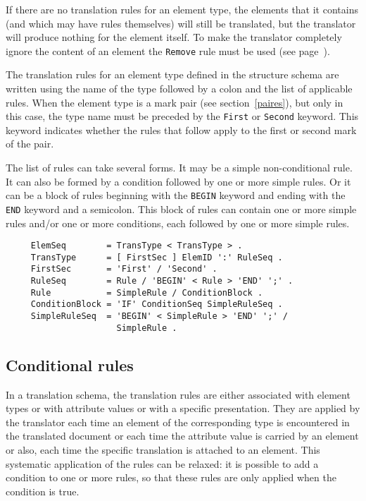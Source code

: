 If there are no translation rules for an element type, the elements
that it contains (and which may have rules themselves) will still be
translated, but the translator will produce nothing for the element
itself.  To make the translator completely ignore the content of an
element the {\tt Remove} rule must be used (see
page~\pageref{remove}).

The translation rules for an element type defined in the structure
schema are written using the name of the type followed by a colon and
the list of applicable rules.  When the element  type is a mark pair
(see section~\ref{paires}), but only in this case, the type name must
be preceded by the {\tt First} or {\tt Second} keyword.  This keyword
indicates whether the rules that follow apply to the first or second
mark of the pair.

The list of rules can take several forms.  It may be a simple
non-conditional rule.  It can also be formed by a condition followed
by one or more simple rules.  Or it can be a block of rules beginning
with the {\tt BEGIN} keyword and ending with the {\tt END} keyword and
a semicolon.  This block of rules can contain one or more simple rules
and/or one or more conditions, each followed by one or more simple
rules.

\begin{verbatim}
     ElemSeq        = TransType < TransType > .
     TransType      = [ FirstSec ] ElemID ':' RuleSeq .
     FirstSec       = 'First' / 'Second' .
     RuleSeq        = Rule / 'BEGIN' < Rule > 'END' ';' .
     Rule           = SimpleRule / ConditionBlock .
     ConditionBlock = 'IF' ConditionSeq SimpleRuleSeq .
     SimpleRuleSeq  = 'BEGIN' < SimpleRule > 'END' ';' / 
                      SimpleRule .
\end{verbatim}

\subsection{Conditional rules}
\label{tradcond}

In a translation schema, the translation rules are either associated
with element types or with attribute values or with a specific
presentation.  They are applied by the translator each time an element
of the corresponding type is encountered in the translated document or
each time the attribute value is carried by an element or also, each
time the specific translation is attached to an element.  This
systematic application of the rules can be relaxed: it is possible to
add a condition to one or more rules, so that these rules are only
applied when the condition is true.

